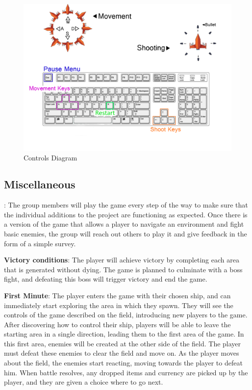 \documentclass[12pt]{article}       %
\def\hs{\hspace{15pt}}
\begin{document}
\begin{figure} [H]
\centering
\includegraphics[width=6.3 in]{ControlDiagramFinal.png}
\caption{Controls Diagram} \label{Controls}
\end{figure}

\subsection{Miscellaneous}
\hs {\bf Testing plans}: The group members will play the game every step of the way to make sure that the individual additions to the project are functioning as expected. Once there is a version of the game that allows a player to navigate an environment and fight basic enemies, the group will reach out others to play it and give feedback in the form of a simple survey. 

{\bf Victory conditions}: The player will achieve victory by completing each area that is generated without dying. The game is planned to culminate with a boss fight, and defeating this boss will trigger victory and end the game.

{\bf First Minute}: The player enters the game with their chosen ship, and can immediately start exploring the area in which they spawn. They will see the controls of the game described on the field, introducing new players to the game. After discovering how to control their ship, players will be able to leave the starting area in a single direction, leading them to the first area of the game. In this first area, enemies will be created at the other side of the field. The player must defeat these enemies to clear the field and move on. As the player moves about the field, the enemies start reacting, moving towards the player to defeat him. When battle resolves, any dropped items and currency are picked up by the player, and they are given a choice where to go next.
\end{document}
